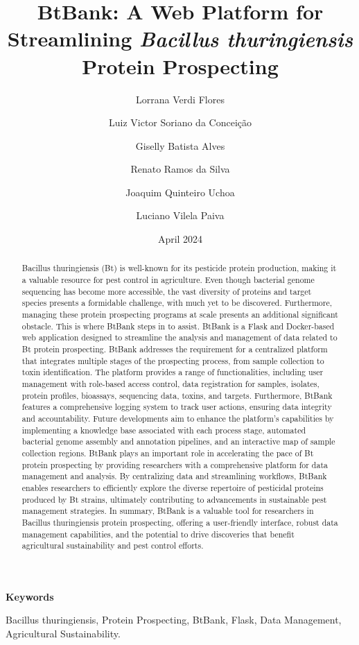 \documentclass{article}
\title{BtBank: A Web Platform for Streamlining \textit{Bacillus thuringiensis} Protein Prospecting}
\author[1]{Lorrana Verdi Flores}
\author[2]{Luiz Victor Soriano da Conceição}
\author[3]{Giselly Batista Alves}
\author[4]{Renato Ramos da Silva}
\author[5]{Joaquim Quinteiro Uchoa}
\author[6]{Luciano Vilela Paiva}
\affil[1,2,3,4,5,6]{Universidade Federal de Lavras}
\date{April 2024}
\begin{document}
\maketitle
\begin{abstract}
Bacillus thuringiensis (Bt) is well-known for its pesticide protein production, making it a valuable resource for pest control in agriculture. Even though bacterial genome sequencing has become more accessible, the vast diversity of proteins and target species presents a formidable challenge, with much yet to be discovered. Furthermore, managing these protein prospecting programs at scale presents an additional significant obstacle. This is where BtBank steps in to assist. BtBank is a Flask and Docker-based web application designed to streamline the analysis and management of data related to Bt protein prospecting. BtBank addresses the requirement for a centralized platform that integrates multiple stages of the prospecting process, from sample collection to toxin identification. The platform provides a range of functionalities, including user management with role-based access control, data registration for samples, isolates, protein profiles, bioassays, sequencing data, toxins, and targets. Furthermore, BtBank features a comprehensive logging system to track user actions, ensuring data integrity and accountability. Future developments aim to enhance the platform's capabilities by implementing a knowledge base associated with each process stage, automated bacterial genome assembly and annotation pipelines, and an interactive map of sample collection regions. BtBank plays an important role in accelerating the pace of Bt protein prospecting by providing researchers with a comprehensive platform for data management and analysis. By centralizing data and streamlining workflows, BtBank enables researchers to efficiently explore the diverse repertoire of pesticidal proteins produced by Bt strains, ultimately contributing to advancements in sustainable pest management strategies. In summary, BtBank is a valuable tool for researchers in Bacillus thuringiensis protein prospecting, offering a user-friendly interface, robust data management capabilities, and the potential to drive discoveries that benefit agricultural sustainability and pest control efforts.

\end{abstract}

\textbf{Keywords}

Bacillus thuringiensis, Protein Prospecting, BtBank, Flask, Data Management, Agricultural Sustainability.
\end{document}
